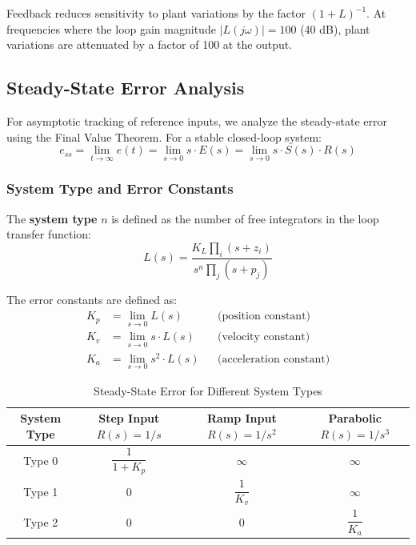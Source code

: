 \begin{theorem}
Feedback reduces sensitivity to plant variations by the factor $(1 + L)^{-1}$. At frequencies where the loop gain magnitude $|L(j\omega)| = 100$ (40 dB), plant variations are attenuated by a factor of 100 at the output.
\end{theorem}

\subsection{Steady-State Error Analysis}

For asymptotic tracking of reference inputs, we analyze the steady-state error using the Final Value Theorem. For a stable closed-loop system:
\begin{equation}
e_{ss} = \lim_{t \to \infty} e(t) = \lim_{s \to 0} s \cdot E(s) = \lim_{s \to 0} s \cdot S(s) \cdot R(s)
\label{eq:steady_state_error}
\end{equation}

\subsubsection{System Type and Error Constants}

The \textbf{system type} $n$ is defined as the number of free integrators in the loop transfer function:
\begin{equation}
L(s) = \frac{K_L \prod_i (s + z_i)}{s^n \prod_j (s + p_j)}
\label{eq:system_type}
\end{equation}

The error constants are defined as:
\begin{align}
K_p &= \lim_{s \to 0} L(s) && \text{(position constant)} \label{eq:kp}\\
K_v &= \lim_{s \to 0} s \cdot L(s) && \text{(velocity constant)} \label{eq:kv}\\
K_a &= \lim_{s \to 0} s^2 \cdot L(s) && \text{(acceleration constant)} \label{eq:ka}
\end{align}

\begin{table}[htbp]
\centering
\caption{Steady-State Error for Different System Types}
\label{tab:steady_state_error}
\begin{tabular}{cccc}
\toprule
\textbf{System Type} & \textbf{Step Input} $R(s) = 1/s$ & \textbf{Ramp Input} $R(s) = 1/s^2$ & \textbf{Parabolic} $R(s) = 1/s^3$ \\
\midrule
Type 0 & $\dfrac{1}{1+K_p}$ & $\infty$ & $\infty$ \\[2ex]
\midrule
Type 1 & 0 & $\dfrac{1}{K_v}$ & $\infty$ \\[2ex]
\midrule
Type 2 & 0 & 0 & $\dfrac{1}{K_a}$ \\[2ex]
\bottomrule
\end{tabular}
\end{table}

